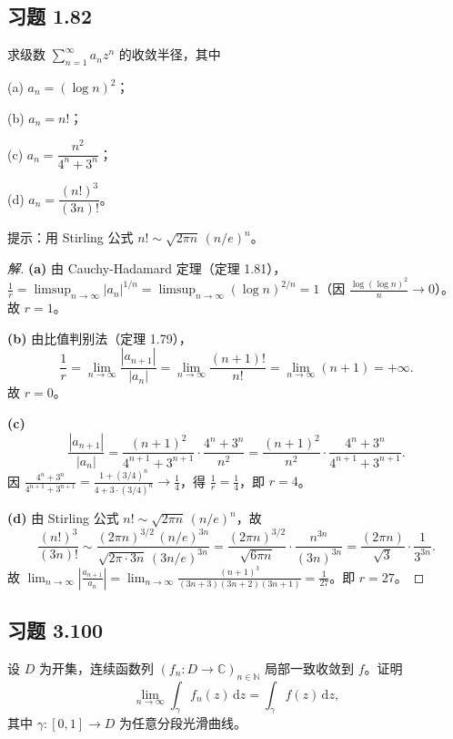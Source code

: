 \documentclass[11pt,a4paper]{article}
\newcommand{\C}{\mathbb{C}}
\newcommand{\N}{\mathbb{N}}
\newcommand{\dd}{\mathrm{d}}
\theoremstyle{definition}
\newenvironment{solution}{\begin{proof}[解]}{\end{proof}}
\begin{document}
\subsection{习题 1.82}

求级数 $\sum_{n=1}^{\infty} a_n z^n$ 的收敛半径，其中

(a) $a_n = (\log n)^2$；

(b) $a_n = n!$；

(c) $a_n = \dfrac{n^2}{4^n + 3^n}$；

(d) $a_n = \dfrac{(n!)^3}{(3n)!}$。

提示：用 Stirling 公式 $n! \sim \sqrt{2\pi n}\,(n/e)^n$。

\begin{solution}
  \textbf{(a)}\;
  由 Cauchy-Hadamard 定理（定理 1.81），$\frac{1}{r} = \limsup_{n\to\infty} |a_n|^{1/n} = \limsup_{n\to\infty} (\log n)^{2/n} = 1$（因 $\frac{\log(\log n)^2}{n} \to 0$）。故 $r = 1$。

  \medskip

  \textbf{(b)}\;
  由比值判别法（定理 1.79），
  \[
    \frac{1}{r}
    = \lim_{n\to\infty} \frac{|a_{n+1}|}{|a_n|}
    = \lim_{n\to\infty} \frac{(n+1)!}{n!}
    = \lim_{n\to\infty} (n+1) = +\infty.
  \]
  故 $r = 0$。

  \medskip

  \textbf{(c)}\;
  \[
    \frac{|a_{n+1}|}{|a_n|}
    = \frac{(n+1)^2}{4^{n+1}+3^{n+1}}
    \cdot \frac{4^n + 3^n}{n^2}
    = \frac{(n+1)^2}{n^2} \cdot \frac{4^n + 3^n}{4^{n+1}+3^{n+1}}.
  \]
  因 $\frac{4^n + 3^n}{4^{n+1}+3^{n+1}} = \frac{1+(3/4)^n}{4+3\cdot(3/4)^n} \to \frac{1}{4}$，得 $\frac{1}{r} = \frac{1}{4}$，即 $r = 4$。

  \medskip

  \textbf{(d)}\;
  由 Stirling 公式 $n! \sim \sqrt{2\pi n}\,(n/e)^n$，故
  \[
    \frac{(n!)^3}{(3n)!}
    \sim \frac{(2\pi n)^{3/2}\,(n/e)^{3n}}
    {\sqrt{2\pi \cdot 3n}\,(3n/e)^{3n}}
    = \frac{(2\pi n)^{3/2}}{\sqrt{6\pi n}}
    \cdot \frac{n^{3n}}{(3n)^{3n}}
    = \frac{(2\pi n)}{\sqrt{3}} \cdot \frac{1}{3^{3n}}.
  \]
  故 $\lim_{n\to\infty} \left|\frac{a_{n+1}}{a_n}\right| = \lim_{n\to\infty} \frac{(n+1)^3}{(3n+3)(3n+2)(3n+1)} = \frac{1}{27}$。即 $r = 27$。
\end{solution}

\subsection{习题 3.100}

设 $D$ 为开集，连续函数列 $(f_n \colon D \to \C)_{n\in\N}$ 局部一致收敛到 $f$。证明
\[
  \lim_{n\to\infty} \int_\gamma f_n(z)\,\dd z
  = \int_\gamma f(z)\,\dd z,
\]
其中 $\gamma \colon [0,1] \to D$ 为任意分段光滑曲线。
\end{document}
